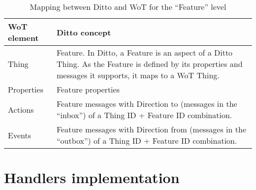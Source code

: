 \begin{table}[H]
    \begin{tabular}{|p{}|p{}|}
    \hline
    \textbf{WoT element} & \textbf{Ditto concept} \\ \hline
    Thing & Feature. In Ditto, a Feature is an aspect of a Ditto Thing. As the Feature is defined by its properties and messages it supports, it maps to a WoT Thing. \\ \hline
    Properties & Feature properties \\ \hline
    Actions &	Feature messages with Direction to (messages in the “inbox”) of a Thing ID + Feature ID combination. \\ \hline
    Events &	Feature messages with Direction from (messages in the “outbox”) of a Thing ID + Feature ID combination. \\ \hline
    \end{tabular}
    \caption{Mapping between Ditto and WoT for the ``Feature'' level}
    \label{tab:ditto-wot-feature}
\end{table}

\section{Handlers implementation}
